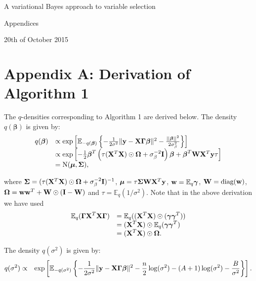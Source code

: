 \documentclass[11pt]{article}
\newtheorem{Main Result}{Main Result}
\def\vectorfontone{\bf}
\def\vectorfonttwo{\boldsymbol}
\def\vw{{\vectorfontone w}}                      %
\def\vy{{\vectorfontone y}}                      %
\def\vbeta{{\vectorfonttwo \beta}}               %
\def\vgamma{{\vectorfonttwo \gamma}}             %
\def\vmu{{\vectorfonttwo \mu}}                   %
\def\matrixfontone{\bf}
\def\matrixfonttwo{\boldsymbol}
\def\mI{{\matrixfontone I}}                      %
\def\mW{{\matrixfontone W}}                      %
\def\mX{{\matrixfontone X}}                      %
\def\mGamma{{\matrixfonttwo \Gamma}}             %
\def\mSigma{{\matrixfonttwo \Sigma}}             %
\def\mOmega{{\matrixfonttwo \Omega}}             %
\def\bE{{\mathbb E}}                             %
\def\ds{\displaystyle}
\newcommand{\joc}[1]{{\color{black}#1}}
\begin{document}
\small{

}

\newpage

\setcounter{page}{1}



\centerline{\sf\Large A variational Bayes approach to variable selection}
\medskip
\centerline{\sf\Large Appendices}
\medskip
 
\medskip
\centerline{20th of October 2015}



\section*{Appendix A: Derivation of Algorithm 1}

\joc{
\noindent The $q$-densities corresponding to Algorithm 1 are derived below.
The density $q(\vbeta)$ is given by:
$$
\begin{array}{ll}
q(\vbeta)
&\propto\exp\left[\bE_{-q(\vbeta)}
\left\{ -\frac{1}{2\sigma^2}\| \vy-\mX\mGamma\vbeta \|^2 
-\frac{||\vbeta||^2}{2\sigma^2_\beta}\right\}\right]\\
&\propto\exp\left[ 
-\tfrac{1}{2}\vbeta^T\left( \tau  (\mX^T\mX)\odot \mOmega + \sigma_\beta^{-2}\mI \right)\vbeta 
+ \vbeta^T\mW\mX^T\vy \tau  \right] \\
&=\mbox{N}(\vmu,\mSigma),
\end{array}
$$

\noindent where $\mSigma=(\tau (\mX^T\mX)\odot\mOmega + \sigma_\beta^{-2}\mI)^{-1}$, 
$\vmu=\tau\mSigma\mW\mX^T\vy$, $\vw=\bE_q\vgamma$, $\mW=\mbox{diag}(\vw)$, 
$\mOmega = \vw\vw^{T} + \mW\odot(\mI - \mW)$ and $\tau=\bE_q(1/\sigma^2)$. 
Note that in the above derivation we have used
$$
\begin{array}{rl}
\ds \bE_q(\mGamma\mX^T\mX\mGamma) 
    & \ds = \bE_q((\mX^T\mX) \odot(\vgamma\vgamma^T)) \\
    & \ds = (\mX^T\mX) \odot \bE_q(\vgamma\vgamma^T) \\
    & \ds = (\mX^T\mX) \odot \mOmega. \\
\end{array}
$$

\noindent 
The density $q(\sigma^2)$ is given by:
\begin{eqnarray*}
\ds q(\sigma^2)
	& \propto 
	& \exp\left[\bE_{-q(\sigma^2)}\left\{
	-\frac{1}{2\sigma^2}\| \vy-\mX\mGamma\vbeta\|^2 -\frac{n}{2}\log(\sigma^2) - (A+1)\log(\sigma^2)
	-\frac{B}{\sigma^2}\right\}\right].
\end{eqnarray*}

}
\end{document}
